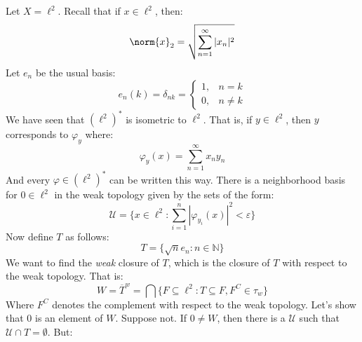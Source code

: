 \documentclass[crop=false,class=book,oneside]{standalone}                      %
\begin{document}
        \begin{lexample}
            Let $X=\ell^{2}$. Recall that if $x\in\ell^{2}$, then:
            \begin{equation}
                \norm{x}_{2}=
                    \sqrt{\sum_{n=1}^{\infty}|x_{n}|^{2}}
            \end{equation}
            Let $e_{n}$ be the usual basis:
            \begin{equation}
                e_{n}(k)=\delta_{nk}=
                    \begin{cases}
                        1,&n=k\\
                        0,&n\ne{k}
                    \end{cases}
            \end{equation}
            We have seen that $(\ell^{2})^{*}$ is isometric to
            $\ell^{2}$. That is, if $y\in\ell^{2}$, then
            $y$ corresponds to $\varphi_{y}$ where:
            \begin{equation}
                \varphi_{y}(x)=\sum_{n=1}^{\infty}
                    x_{n}y_{n}
            \end{equation}
            And every $\varphi\in(\ell^{2})^{*}$ can be written
            this way. There is a neighborhood basis for
            $0\in\ell^{2}$ in the weak topology given by the
            sets of the form:
            \begin{equation}
                \mathcal{U}=\{x\in\ell^{2}:
                    \sum_{i=1}^{n}|\varphi_{y_{i}}(x)|^{2}
                    <\varepsilon\}
            \end{equation}
            Now define $T$ as follows:
            \begin{equation}
                T=\{\sqrt{n}e_{n}:n\in\mathbb{N}\}
            \end{equation}
            We want to find the \textit{weak} closure of $T$, which
            is the closure of $T$ with respect to the weak topology.
            That is:
            \begin{equation}
                W=\overline{T}^{w}=
                \bigcap\{F\subseteq\ell^{2}:
                    T\subseteq{F},F^{C}\in\tau_{w}\}
            \end{equation}
            Where $F^{C}$ denotes the complement with respect
            to the weak topology. Let's show that $0$ is an
            element of $W$. Suppose not. If $0\ne{W}$, then
            there is a $\mathcal{U}$ such that
            $\mathcal{U}\cap{T}=\emptyset$. But:

\end{lexample}
\end{document}
